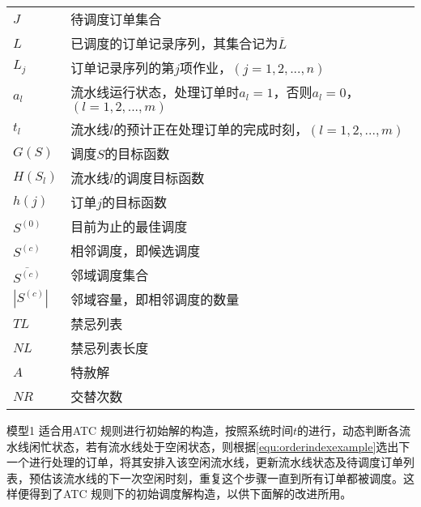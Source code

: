 \begin{supertabular}{ll}
$J$ & 待调度订单集合\\
$L$ & 已调度的订单记录序列，其集合记为$\overline{L}$\\
$L_j$ & 订单记录序列的第$j$项作业，$(j = 1,2,...,n)$\\
$a_l$ & 流水线运行状态，处理订单时$a_l = 1$，否则$a_l = 0$，$(l = 1,2,...,m)$\\
$t_l$ & 流水线$l$的预计正在处理订单的完成时刻，$(l = 1,2,...,m)$\\
$G(S)$& 调度$S$的目标函数\\
$H(S_l)$ & 流水线$l$的调度目标函数\\
$h(j)$ & 订单$j$的目标函数\\
$S^{(0)}$ & 目前为止的最佳调度\\
$S^{(c)}$& 相邻调度，即候选调度\\
$\overline{S^{(c)}}$& 邻域调度集合\\
$|S^{(c)}|$& 邻域容量，即相邻调度的数量\\
$TL$ & 禁忌列表\\
$NL$ &禁忌列表长度\\
$A$ & 特赦解\\
$NR$ &交替次数\\[3pt]
\end{supertabular}

模型1 适合用ATC 规则进行初始解的构造，按照系统时间$t$的进行，动态判断各流水线闲忙状态，若有流水线处于空闲状态，则根据\eqref{equ:orderindexexample}选出下一个进行处理的订单，将其安排入该空闲流水线，更新流水线状态及待调度订单列表，预估该流水线的下一次空闲时刻，重复这个步骤一直到所有订单都被调度。这样便得到了ATC 规则下的初始调度解构造，以供下面解的改进所用。
%

